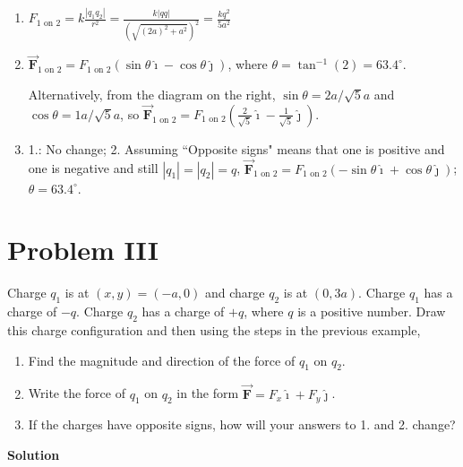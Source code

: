 \documentclass{article}
\renewcommand{\mbox}{\text}
\newcommand{\ds}[0]{\displaystyle}
\newcommand{\ihat}[0]{\hat{\boldsymbol{\imath}}}
\newcommand{\jhat}[0]{\hat{\boldsymbol{\jmath}}}
\newcommand{\bfvec}[1]{\vec{\mathbf{#1}}}
\begin{document}
    \begin{enumerate}

      \item $\ds F_{1\mbox{ on } 2}=k\frac{|q_1q_2|}{r^2}=\frac{k|qq|}{(\sqrt{(2a)^2+a^2})^2}=\frac{kq^2}{5a^2}$

      \item $\bfvec{F}_{1\mbox{ on } 2} = F_{1\mbox{ on } 2}(\sin \theta \ihat - \cos \theta\jhat)$, where $\theta=\tan^{-1}(2) = 63.4^\circ$.

                Alternatively, from the diagram on the right, $\sin\theta = 2a/\sqrt{5}a$ and $\cos\theta = 1a/\sqrt{5}a$, so 
                $\ds\bfvec{F}_{1\mbox{ on } 2} = F_{1\mbox{ on } 2}\left(\frac{2}{\sqrt{5}}\ihat - \frac{1}{\sqrt{5}}\jhat\right)$.

      \item 1.: No change; 2. Assuming ``Opposite signs" means that one is positive and one is negative and still $|q_1|=|q_2|=q$, $\bfvec{F}_{1\mbox{ on } 2} = F_{1\mbox{ on } 2}(-\sin \theta \ihat + \cos \theta\jhat)$; $\theta=63.4^\circ$.

    \end{enumerate}
\else


\fi
\ifsolutions\else

\fi

\section{Problem III}

Charge $q_1$ is at $(x,y)=(-a,0)$ and charge $q_2$ is at $(0, 3a)$. Charge $q_1$ has a charge of $-q$. Charge $q_2$ has a charge of $+q$, where $q$ is a positive number. Draw this charge configuration and then using the steps in the previous example,

\begin{enumerate}

  \item Find the magnitude and direction of the force of $q_1$ on $q_2$.

  \item Write the force of $q_1$ on $q_2$ in the form $\bfvec{F}=F_x\ihat + F_y\jhat$.

  \item If the charges have opposite signs, how will your answers to 1. and 2. change?

\end{enumerate}

\ifsolutions
{\bf Solution}

\end{document}
